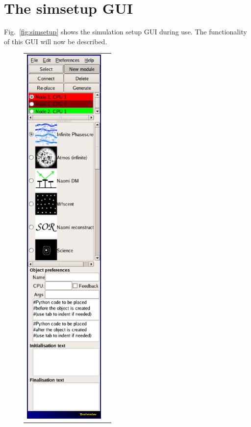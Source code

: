 \documentclass{article}
\begin{document}
\section{The simsetup GUI}
Fig.~\ref{fig:simsetup} shows the simulation setup GUI during use.
The functionality of this GUI will now be described.
\begin{figure}
\begin{tabular}{ll}
\includegraphics[width=4cm]{pics/simsetuptoolbar.eps} &

\end{tabular}
\end{figure}
\end{document}
